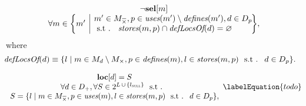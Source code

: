\begin{equation}
  \begin{array}{c}
    \neg\mVar{sel}[m] \\
    \forall m \in
      \mSetBuilder*{m'}%
                   {%
                     \begin{array}{@{}l@{}}
                       m' \in \mKillMatchCompSet,
                       p \in \mUses(m') \setminus \mDefines(m'),
                       d \in \mDataSet[p] \hspace{-1pt} \\
                       \text{\st }
                       \mStores(m, p) \cap \mDefLocsOf(d) = \mEmptySet
                     \end{array}
                   } \!,
  \end{array}
\end{equation}
%
where
%
\begin{equation}
  \hspace*{-1em}
  \mDefLocsOf(d)
  \equiv
  \mSetBuilder{l}%
              {%
                m \in \mMatchSet[d] \setminus \mKillMatchSet,
                p \in \mDefines(m),
                l \in \mStores(m, p)
                \text{ \st }
                d \in \mDataSet[p]
              }.
\end{equation}



\begin{equation}
  \begin{array}{c}
    \mVar{loc}[d] = S \\
    \forall d \in \mDataUsedOnceSet,
    \forall S \in
      \mPowerset{\mLocationSet \, \cup \, \mSet{\mNullLocation}} \text{ \st} \\
    S = \mSetBuilder{l}%
                    {%
                      m \in \mKillMatchCompSet,
                      p \in \mUses(m),
                      l \in \mStores(m, p)
                      \text{ \st }
                      d \in \mDataSet[p]
                    },
  \end{array}
  \labelEquation{todo}
\end{equation}



